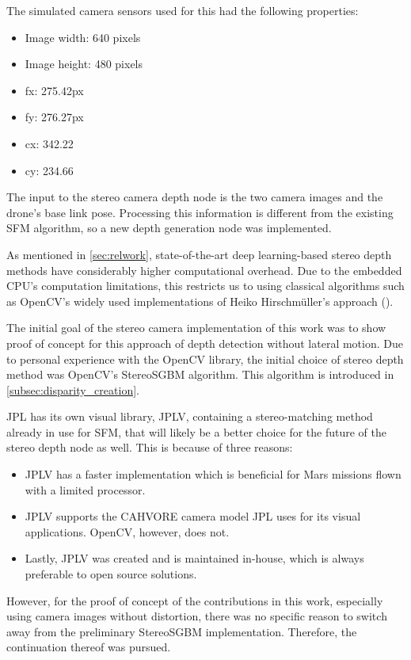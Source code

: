 The simulated camera sensors used for this had the following properties:

\begin{itemize}
    \item Image width: 640 pixels
    \item Image height: 480 pixels
    \item fx: 275.42px
    \item fy: 276.27px
    \item cx: 342.22
    \item cy: 234.66
\end{itemize}

The input to the stereo camera depth node is the two camera images and the drone's base link pose. Processing this information is different from the existing SFM algorithm, so a new depth generation node was implemented. 

As mentioned in \cref{sec:relwork}, state-of-the-art deep learning-based stereo depth methods have considerably higher computational overhead. Due to the embedded CPU's computation limitations, this restricts us to using classical algorithms such as OpenCV's widely used implementations of Heiko Hirschmüller's approach (\citep{Stereo}).

The initial goal of the stereo camera implementation of this work was to show proof of concept for this approach of depth detection without lateral motion. Due to personal experience with the OpenCV library, the initial choice of stereo depth method was OpenCV's StereoSGBM algorithm. This algorithm is introduced in \cref{subsec:disparity_creation}.

JPL has its own visual library, JPLV, containing a stereo-matching method already in use for SFM, that will likely be a better choice for the future of the stereo depth node as well. This is because of three reasons:
\begin{itemize}
    \item JPLV has a faster implementation which is beneficial for Mars missions flown with a limited processor.
    \item JPLV supports the CAHVORE camera model JPL uses for its visual applications. OpenCV, however, does not.
    \item Lastly, JPLV was created and is maintained in-house, which is always preferable to open source solutions. 
\end{itemize}
However, for the proof of concept of the contributions in this work, especially using camera images without distortion, there was no specific reason to switch away from the preliminary StereoSGBM implementation. Therefore, the continuation thereof was pursued.

